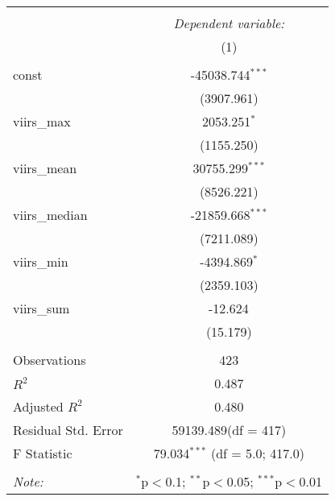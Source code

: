 \begin{table}[!htbp] \centering
\begin{tabular}{@{\extracolsep{5pt}}lc}
\\[-1.8ex]\hline
\hline \\[-1.8ex]
& \multicolumn{1}{c}{\textit{Dependent variable:}} \
\cr \cline{1-2}
\\[-1.8ex] & (1) \\
\hline \\[-1.8ex]
 const & -45038.744$^{***}$ \\
  & (3907.961) \\
 viirs_max & 2053.251$^{*}$ \\
  & (1155.250) \\
 viirs_mean & 30755.299$^{***}$ \\
  & (8526.221) \\
 viirs_median & -21859.668$^{***}$ \\
  & (7211.089) \\
 viirs_min & -4394.869$^{*}$ \\
  & (2359.103) \\
 viirs_sum & -12.624$^{}$ \\
  & (15.179) \\
\hline \\[-1.8ex]
 Observations & 423 \\
 $R^2$ & 0.487 \\
 Adjusted $R^2$ & 0.480 \\
 Residual Std. Error & 59139.489(df = 417)  \\
 F Statistic & 79.034$^{***}$ (df = 5.0; 417.0) \\
\hline
\hline \\[-1.8ex]
\textit{Note:} & \multicolumn{1}{r}{$^{*}$p$<$0.1; $^{**}$p$<$0.05; $^{***}$p$<$0.01} \\
\end{tabular}
\end{table}